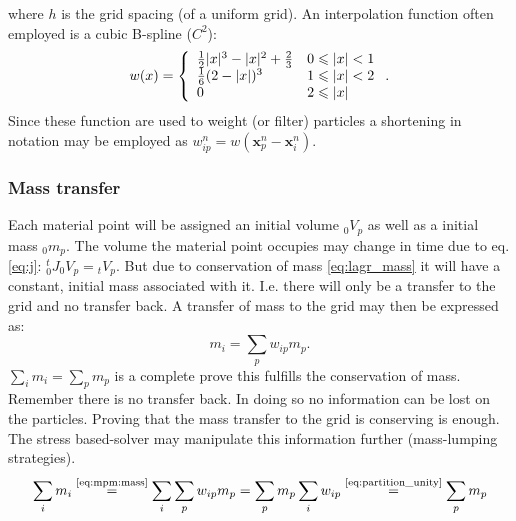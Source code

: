\documentclass[m,times]{cgMA}
\begin{document}
where $h$ is the grid spacing (of a uniform grid). An interpolation function often employed is a cubic B-spline ($C^2$):
\begin{equation}\label{eq:cubic_weights}
  w(x) = \left\{ \begin{array} { l l } { \frac { 1 } { 2 } | x | ^ { 3 } - | x | ^ { 2 } + \frac { 2 } { 3 } } & { 0 \leqslant | x | < 1 } \\ { \frac { 1 } { 6 } ( 2 - | x | ) ^ { 3 } } & { 1 \leqslant | x | < 2 } \\ { 0 } & { 2 \leqslant | x | } \end{array} \right. .
\end{equation}
Since these function are used to weight (or filter) particles a shortening in notation may be employed as $ w_{ip}^n = w(\boldsymbol{x}_p^n-\boldsymbol{x}_i^n)$.
\cite{MPM:APIC}\cite{MPM:COURSE}\cite{steffen2008analysis}\cite{gao2017adaptive}
\subsubsection{Mass transfer}\label{sec:mass}
Each material point will be assigned an initial volume $_0V_p$ as well as a initial mass $_0m_p$. The volume the material point occupies may change in time due to eq. \ref{eq:j}: ${^t_0}J _0V_p = {_tV_p}$. But due to conservation of mass \ref{eq:lagr_mass} it will have a constant, initial mass associated with it. I.e. there will only be a transfer to the grid and no transfer back.
A transfer of mass to the grid may then be expressed as:
\begin{equation}\label{eq:mpm:mass}
  m_i = \sum_p w_{ip}m_p.
\end{equation}
$\sum_i m_i =\sum_p m_p$ is a complete prove this fulfills the conservation of mass. Remember there is no transfer back. In doing so no information can be lost on the particles. Proving that the mass transfer to the grid is conserving is enough. The stress based-solver may manipulate this information further (mass-lumping strategies).
\begin{equation}
  \sum_i m_i
  \stackrel{\text{\ref{eq:mpm:mass}}}{=}
  \sum _i \sum_p w_{ip} m_p =
  \sum _p m_p \sum_i w_{ip}
  \stackrel{\text{\ref{eq:partition_unity}}}{=}
  \sum_p m_p
\end{equation}
\cite{MPM:APIC}\cite{MPM:COURSE}
\end{document}
